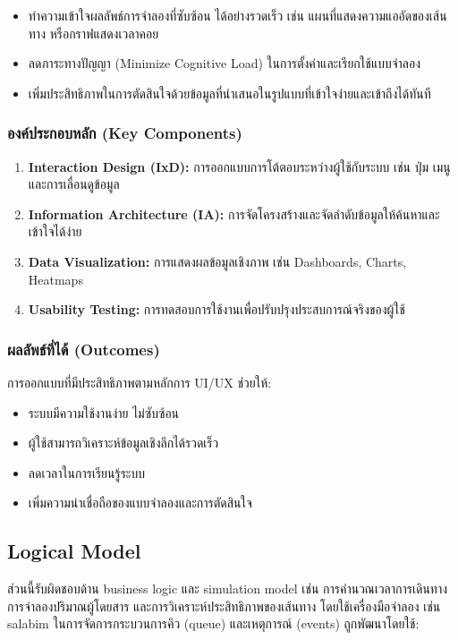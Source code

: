 \begin{itemize}
    \item ทำความเข้าใจผลลัพธ์การจำลองที่ซับซ้อน ได้อย่างรวดเร็ว เช่น แผนที่แสดงความแออัดของเส้นทาง
    หรือกราฟแสดงเวลาคอย
    \item ลดภาระทางปัญญา (Minimize Cognitive Load) ในการตั้งค่าและเรียกใช้แบบจำลอง
    \item เพิ่มประสิทธิภาพในการตัดสินใจด้วยข้อมูลที่นำเสนอในรูปแบบที่เข้าใจง่ายและเข้าถึงได้ทันที
\end{itemize}

\subsubsection{\textbf{องค์ประกอบหลัก (Key Components)}}
\begin{enumerate}
    \item \textbf{Interaction Design (IxD):} การออกแบบการโต้ตอบระหว่างผู้ใช้กับระบบ เช่น ปุ่ม เมนู และการเลื่อนดูข้อมูล
    \item \textbf{Information Architecture (IA):} การจัดโครงสร้างและจัดลำดับข้อมูลให้ค้นหาและเข้าใจได้ง่าย
    \item \textbf{Data Visualization:} การแสดงผลข้อมูลเชิงภาพ เช่น Dashboards, Charts, Heatmaps
    \item \textbf{Usability Testing:} การทดสอบการใช้งานเพื่อปรับปรุงประสบการณ์จริงของผู้ใช้
\end{enumerate}

\subsubsection{\textbf{ผลลัพธ์ที่ได้ (Outcomes)}}
\begin{mypara}
    \indent การออกแบบที่มีประสิทธิภาพตามหลักการ UI/UX ช่วยให้:
\end{mypara}
\begin{itemize}
    \item ระบบมีความใช้งานง่าย ไม่ซับซ้อน
    \item ผู้ใช้สามารถวิเคราะห์ข้อมูลเชิงลึกได้รวดเร็ว
    \item ลดเวลาในการเรียนรู้ระบบ
    \item เพิ่มความน่าเชื่อถือของแบบจำลองและการตัดสินใจ
\end{itemize}


\subsection{Logical Model}
  ส่วนนี้รับผิดชอบด้าน business logic และ simulation model
  เช่น การคำนวณเวลาการเดินทาง การจำลองปริมาณผู้โดยสาร 
  และการวิเคราะห์ประสิทธิภาพของเส้นทาง โดยใช้เครื่องมือจำลอง 
  เช่น salabim ในการจัดการกระบวนการคิว (queue) และเหตุการณ์ (events) ถูกพัฒนาโดยใช้:
